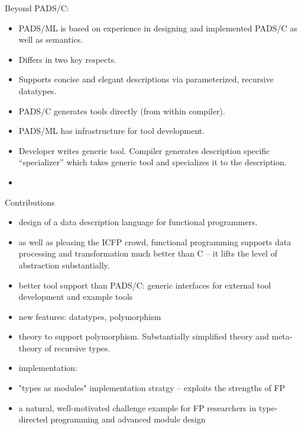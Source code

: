 Beyond PADS/C:
\begin{itemize}
\item PADS/ML is based on experience in designing and implemented
  PADS/C as well as semantics.
\item Differs in two key respects.
\item Supports concise and elegant descriptions via parameterized,
  recursive datatypes.
\item PADS/C generates tools directly (from within compiler).
\item PADS/ML has infrastructure for tool development.
\item Developer writes generic tool. Compiler generates description
  specific ``specializer'' which takes generic tool and specializes it
  to the description.
\item 
\end{itemize}

Contributions
\begin{itemize}
\item design of a data description language for functional programmers.
\item as well as pleasing the ICFP crowd, functional programming
  supports data processing and transformation much better than C -- it
  lifts the level of abstraction substantially.
\item better tool support than PADS/C: generic interfaces for external
  tool development and example tools
\item new features: datatypes, polymorphism
\item theory to support polymorphism. Substantially simplified theory and
meta-theory of recursive types.
\item implementation:
\item "types as modules" implementation stratgy -- exploits the strengths of FP
\item a natural, well-motivated challenge example for FP researchers
  in type-directed programming and advanced module design
\end{itemize}




